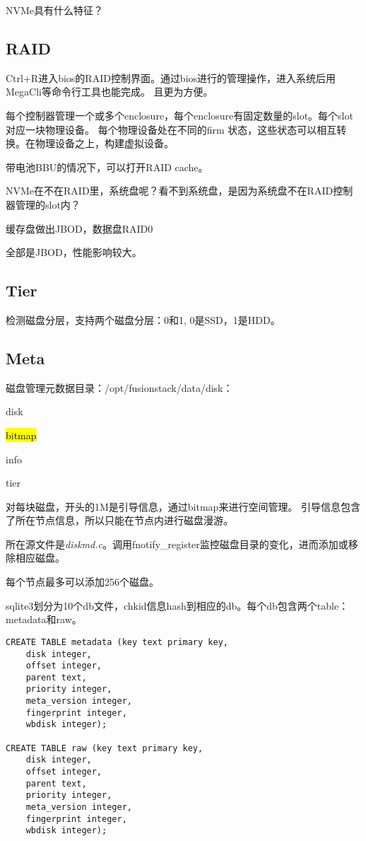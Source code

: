 NVMe具有什么特征？

\subsection{RAID}

Ctrl+R进入bios的RAID控制界面。通过bios进行的管理操作，进入系统后用MegaCli等命令行工具也能完成。
且更为方便。

每个控制器管理一个或多个enclosure，每个enclosure有固定数量的slot。每个slot对应一块物理设备。
每个物理设备处在不同的firm 状态，这些状态可以相互转换。在物理设备之上，构建虚拟设备。

带电池BBU的情况下，可以打开RAID cache。

NVMe在不在RAID里，系统盘呢？看不到系统盘，是因为系统盘不在RAID控制器管理的slot内？

缓存盘做出JBOD，数据盘RAID0

全部是JBOD，性能影响较大。

\subsection{Tier}

检测磁盘分层，支持两个磁盘分层：0和1, 0是SSD，1是HDD。

\subsection{Meta}

磁盘管理元数据目录：/opt/fusionstack/data/disk：
\begin{compactitem}
\item disk
\item \hl{bitmap}
\item info
\item tier
\end{compactitem}

对每块磁盘，开头的1M是引导信息，通过bitmap来进行空间管理。
引导信息包含了所在节点信息，所以只能在节点内进行磁盘漫游。

所在源文件是\emph{diskmd.c}。调用fnotify\_register监控磁盘目录的变化，进而添加或移除相应磁盘。

每个节点最多可以添加256个磁盘。

sqlite3划分为10个db文件，chkid信息hash到相应的db。每个db包含两个table：metadata和raw。

\begin{lstlisting}[frame=single]
CREATE TABLE metadata (key text primary key, 
    disk integer, 
    offset integer, 
    parent text, 
    priority integer, 
    meta_version integer, 
    fingerprint integer, 
    wbdisk integer);

CREATE TABLE raw (key text primary key, 
    disk integer, 
    offset integer, 
    parent text, 
    priority integer, 
    meta_version integer, 
    fingerprint integer, 
    wbdisk integer);
\end{lstlisting}

